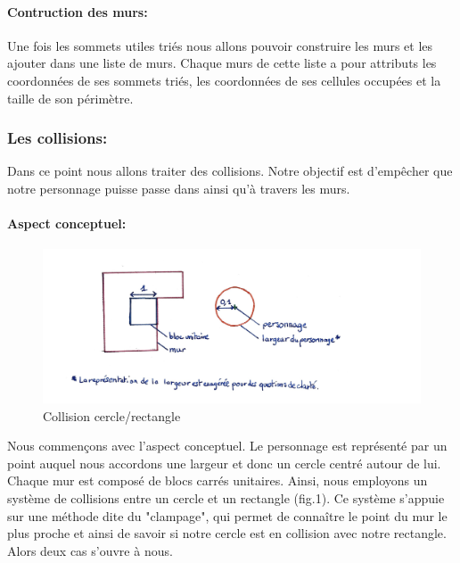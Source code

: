 \documentclass[11pt]{article}
\begin{document}
\paragraph{Contruction des murs:}
Une fois les sommets utiles triés nous allons pouvoir construire les murs et les ajouter dans une liste de murs. Chaque murs de cette liste a pour attributs les coordonnées de ses sommets triés, les coordonnées de ses cellules occupées et la taille de son périmètre.

\subsubsection{Les collisions:}

Dans ce point nous allons traiter des collisions. Notre objectif est d'empêcher
que notre personnage puisse passe dans ainsi qu'à travers les murs.

\paragraph{Aspect conceptuel:}

\begin{figure}
	\centering
	\includegraphics[width=1\textwidth]{image/fig1.jpg}
	\caption{Collision cercle/rectangle}
	\label{fig:collision_cercle_rectangle}
\end{figure}

Nous commençons avec l'aspect conceptuel.
Le personnage est représenté par un point auquel nous accordons une 
largeur et donc un cercle centré autour de lui. Chaque mur est composé de 
blocs carrés unitaires. Ainsi, nous employons un système de collisions 
entre un cercle et un rectangle (fig.1). 
Ce système s'appuie sur une méthode dite du "clampage", qui permet de connaître le point du mur le plus proche 
et ainsi de savoir si notre cercle est en collision avec notre rectangle.
Alors deux cas s'ouvre à nous.
\end{document}
